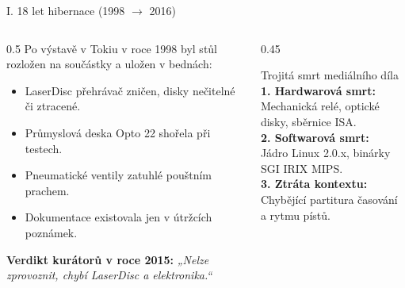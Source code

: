 \documentclass[aspectratio=169,11pt]{beamer}
\begin{document}
\begin{frame}{I. 18 let hibernace (1998 $\rightarrow$ 2016)}
  \begin{columns}
    \begin{column}{0.5\textwidth}
      Po výstavě v Tokiu v roce 1998 byl stůl rozložen na součástky a uložen v bednách:
      \begin{itemize}
        \item LaserDisc přehrávač zničen, disky nečitelné či ztracené.
        \item Průmyslová deska Opto 22 shořela při testech.
        \item Pneumatické ventily zatuhlé pouštním prachem.
        \item Dokumentace existovala jen v útržcích poznámek.
      \end{itemize}
      \vspace{0.3cm}
      \textbf{Verdikt kurátorů v roce 2015:} \textit{„Nelze zprovoznit, chybí LaserDisc a elektronika.“}
    \end{column}
    \begin{column}{0.45\textwidth}
      \begin{block}{Trojitá smrt mediálního díla}
        \textbf{1. Hardwarová smrt:}\\
        Mechanická relé, optické disky, sběrnice ISA.\\
        \vspace{0.2cm}
        \textbf{2. Softwarová smrt:}\\
        Jádro Linux 2.0.x, binárky SGI IRIX MIPS.\\
        \vspace{0.2cm}
        \textbf{3. Ztráta kontextu:}\\
        Chybějící partitura časování a rytmu pístů.
      \end{block}
    \end{column}
  \end{columns}
\end{frame}
\end{document}
